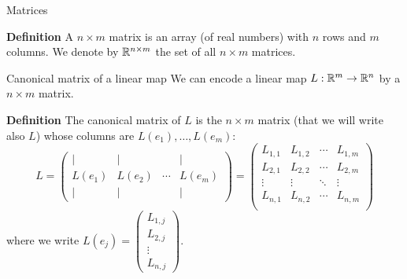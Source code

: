 \documentclass{beamer}
\begin{document}
\begin{frame}[t]{Matrices}
	\begin{block}{\bf Definition}
	A $n \times m$ matrix is an array (of real numbers) with $n$ rows and $m$ columns.
	We denote by $\mathbb{R}^{n \times m}$ the set of all $n \times m$ matrices.
\end{block}

\end{frame}
\begin{frame}{Canonical matrix of a linear map}
We can encode a linear map $L: \mathbb{R}^m \to \mathbb{R}^n$ by a $n \times m$ matrix.
\begin{block}{\bf Definition}
	The canonical matrix of $L$ is the $n \times m$ matrix (that we will write also $L$) whose columns are $L(e_1), \dots, L(e_m)$:
$$
L =
\begin{pmatrix}
	| & | & & | \\
	L(e_1) & L(e_2) & \cdots& L(e_m) \\
	| & | & & |
\end{pmatrix}
= 
\begin{pmatrix}
	L_{1,1} & L_{1,2} & \cdots & L_{1,m} \\
	L_{2,1} & L_{2,2} & \cdots & L_{2,m} \\
	\vdots & \vdots & \ddots & \vdots \\
	L_{n,1} & L_{n,2} & \cdots & L_{n,m} \\
\end{pmatrix}
$$
where we write $L(e_j) = 
\begin{pmatrix}
	L_{1,j} \\
	L_{2,j}\\
	\vdots \\
	L_{n,j}
\end{pmatrix}$.
\end{block}

\end{frame}
\end{document}

